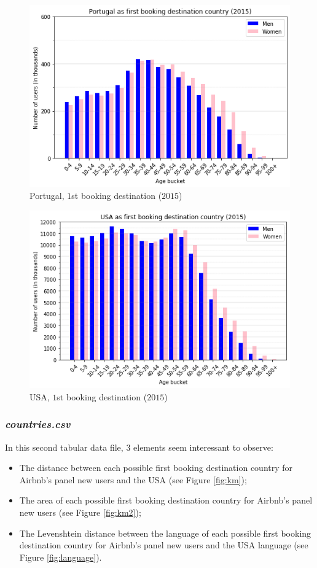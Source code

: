 \documentclass[twocolumn, switch]{article}
\begin{document}
\begin{figure}[H]
\centering
\includegraphics[scale=0.35]{../graphs/age_gender_bkts_PT}
\caption{Portugal, $1$st booking destination ($2015$)}
\label{fig:portugal}
\end{figure}

\begin{figure}[H]
\centering
\includegraphics[scale=0.35]{../graphs/age_gender_bkts_US}
\caption{USA, $1$st booking destination ($2015$)}
\label{fig:usa}
\end{figure}

\subsubsection{\textit{countries.csv}}

In this second tabular data file, $3$ elements seem interessant to observe:
\begin{itemize}
\item The distance between each possible first booking destination country for Airbnb's panel new users and the USA (see Figure \ref{fig:km});
\item The area of each possible first booking destination country for Airbnb's panel new users (see Figure \ref{fig:km2});
\item The Levenshtein distance between the language of each possible first booking destination country for Airbnb's panel new users and the USA language (see Figure \ref{fig:language}).
\end{itemize}
\end{document}
